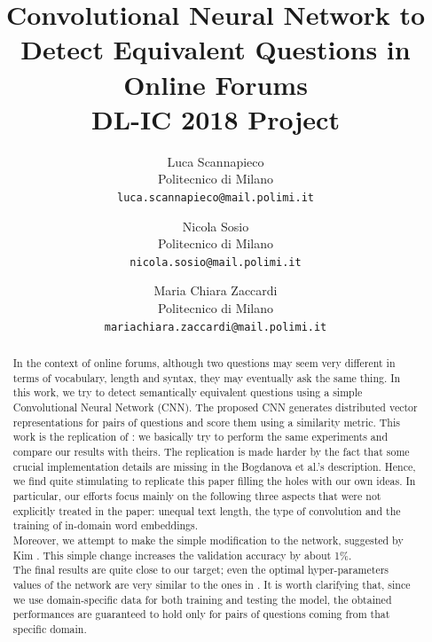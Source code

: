 \documentclass[10pt,twocolumn,letterpaper]{article}
\begin{document}
\title{Convolutional Neural Network to Detect Equivalent Questions in Online Forums  \\ DL-IC 2018 Project} 

\author{Luca Scannapieco\\
Politecnico di Milano\\
{\tt\small luca.scannapieco@mail.polimi.it}
\and
Nicola Sosio\\
Politecnico di Milano\\
{\tt\small nicola.sosio@mail.polimi.it}
\and
Maria Chiara Zaccardi\\
Politecnico di Milano\\
{\tt\small mariachiara.zaccardi@mail.polimi.it}
}

\maketitle

\begin{abstract}
   In the context of online forums, although two questions may seem very different in terms of vocabulary, length and syntax, they may eventually ask the same thing. In this work, we try to detect semantically equivalent questions using a simple Convolutional Neural Network (CNN). The proposed CNN generates distributed vector representations for pairs of questions and score them using a similarity metric. This work is the replication of \cite{bogdanova2015detecting}: we basically try to perform the same experiments and compare our results with theirs. The replication is made harder by the fact that some crucial implementation details are missing in the Bogdanova et al.'s description. Hence, we find quite stimulating to replicate this paper filling the holes with our own ideas. In particular, our efforts focus mainly on the following three aspects that were not explicitly treated in the paper: unequal text length, the type of convolution and the training of in-domain word embeddings. \\
Moreover, we attempt to make the simple modification to the network, suggested by Kim \cite{kim2014convolutional}. This simple change increases the validation accuracy by about 1\%. \\
The final results are quite close to our target; even the optimal hyper-parameters values of the network are very similar to the ones in \cite{bogdanova2015detecting}. It is worth clarifying that, since we use domain-specific data for both training and testing the model, the obtained performances are guaranteed to hold only for pairs of questions coming from that specific domain.
\end{abstract}
\end{document}
